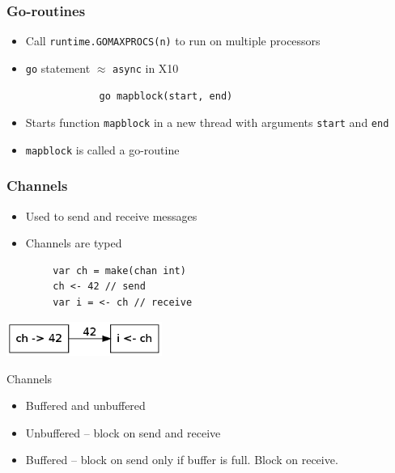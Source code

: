 \documentclass{beamer}
\begin{document}
\begin{frame} [fragile]
\frametitle{Go-routines}
\begin{itemize}
  \item Call \verb=runtime.GOMAXPROCS(n)= to run on multiple processors
  \item \verb=go= statement $\approx$ \verb=async= in X10
\end{itemize}
\begin{center}
\begin{verbatim}
                go mapblock(start, end)
\end{verbatim}
\end{center}
\begin{itemize}
\item Starts function \verb=mapblock= in a new thread with arguments \verb=start= and \verb=end=
\item \verb=mapblock= is called a go-routine
\end{itemize}

\end{frame}

\begin{frame} [fragile]
\frametitle{Channels}
\begin{itemize}
\item Used to send and receive messages
\item Channels are typed
\end{itemize}
\begin{verbatim}
        var ch = make(chan int) 
        ch <- 42 // send 
        var i = <- ch // receive        
\end{verbatim}
\begin{center}
\includegraphics[width=2in]{channel.png}
\end{center}
\end{frame}

\begin{frame}{Channels}

\begin{itemize}
\item Buffered and unbuffered
\item Unbuffered -- block on send and receive
\item Buffered  -- block on send only if buffer is full. Block on receive.

\end{itemize}
\end{frame}
\end{document}

